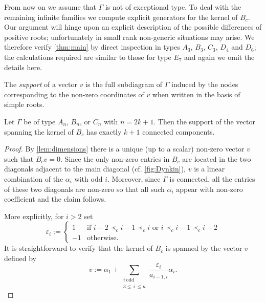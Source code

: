 \documentclass[pdftex]{sigma}
\numberwithin{equation}{section}
\numberwithin{theorem}{section}
\numberwithin{proposition}{section}
\numberwithin{lemma}{section}
\numberwithin{corollary}{section}
\numberwithin{definition}{section}
\numberwithin{example}{section}
\numberwithin{remark}{section}
\numberwithin{note}{section}
\begin{document}
  From now on we assume that $\Gamma$ is not of exceptional type.
  To deal with the remaining infinite families we compute explicit generators for the kernel of $B_c$.
  Our argument will hinge upon an explicit description of the possible differences of positive roots; unfortunately in small rank non-generic situations may arise.
  We therefore verify \cref{thm:main} by direct inspection in types $A_3$, $B_3$, $C_3$, $D_4$ and $D_6$; the calculations required are similar to those for type $E_7$ and again we omit the details here.

  \begin{definition}
    The \emph{support} of a vector $v$ is the full subdiagram of $\Gamma$ induced by the nodes corresponding to the non-zero coordinates of $v$ when written in the basis of simple roots.
  \end{definition}

  \begin{lemma}
    Let $\Gamma$ be of type $A_n$, $B_n$, or $C_n$ with $n=2k+1$.
    Then the support of the vector spanning the kernel of $B_c$ has exactly $k+1$ connected components.
  \end{lemma}
  \begin{proof}
    By \cref{lem:dimensions} there is a unique (up to a scalar) non-zero vector $v$ such that $B_cv=0$.
    Since the only non-zero entries in $B_c$ are located in the two diagonals adjacent to the main diagonal (cf. \cref{fig:Dynkin}), $v$ is a linear combination of the $\alpha_i$ with odd $i$.
    Moreover, since $\Gamma$ is connected, all the entries of these two diagonals are non-zero so that all such $\alpha_i$ appear with non-zero coefficient and the claim follows.

    More explicitly, for $i>2$ set
    \[
      \varepsilon_i :=
      \begin{cases}
        1 & \text{if $i-2\prec_c i-1 \prec_c i$ or $i\prec_c i-1 \prec_c i-2$}\\
        -1 & \text{otherwise.}
      \end{cases}
    \]
    It is straightforward to verify that the kernel of $B_c$ is spanned by the vector $v$ defined by
    \begin{equation}
      \label{eq:vector}
      v :=
      \alpha_1 + \sum_{\substack{i\ \mathrm{odd}\\ 3\le\, i\,\leq n}} \frac{\varepsilon_i}{a_{i-1,i}} \alpha_i.
    \end{equation}
  \end{proof}
\end{document}
